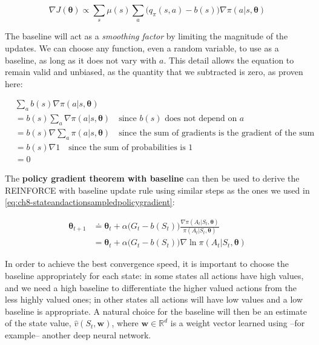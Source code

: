 \begin{equation}
    \nabla J(\boldsymbol{\theta}) \propto \sum_s \mu(s) \sum_a \big(q_\pi(s,a) - b(s) \big) \nabla\pi(a \vert s, \boldsymbol{\theta})
    \label{eq:ch8-policygradienttheoremwithbaseline}
\end{equation}

The baseline will act as a \textit{smoothing factor} by limiting the magnitude of the updates. We can choose any function, even a random variable, to use as a baseline, as long as it does not vary with $a$. This detail allows the equation to remain valid and unbiased, as the quantity that we subtracted is zero, as proven here:

\begin{equation}
    \begin{split}
        & \sum_a b(s) \nabla\pi (a \vert s,\boldsymbol{\theta}) \\
        &= b(s) \sum_a \nabla\pi (a \vert s,\boldsymbol{\theta}) \quad \text{since } b(s) \text{ does not depend on } a\\
        &= b(s) \nabla \sum_a \pi (a \vert s,\boldsymbol{\theta}) \quad \text{since the sum of gradients is the gradient of the sum}\\
        &= b(s) \nabla 1 \quad \text{since the sum of probabilities is 1} \\
        &= 0
    \end{split}
    \label{eq:ch8-policygradientwithbaselineunbiasedproof}
\end{equation}

The \textbf{policy gradient theorem with baseline} can then be used to derive the REINFORCE with baseline update rule using similar steps as the ones we used in \ref{eq:ch8-stateandactionsampledpolicygradient}:

\begin{equation}
    \begin{split}
        \boldsymbol{\theta}_{t+1} &\doteq \boldsymbol{\theta}_t + \alpha \big(G_t - b(S_t) \big) \frac{\nabla \pi (A_t \vert S_t, \boldsymbol{\theta})}{\pi (A_t \vert S_t, \boldsymbol{\theta})} \\
        &= \boldsymbol{\theta}_t + \alpha \big( G_t - b(S_t) \big) \nabla \ln{\pi (A_t \vert S_t, \boldsymbol{\theta})}
    \end{split}
    \label{eq:ch8-reinforcewithbaselineupdaterule}
\end{equation}

In order to achieve the best convergence speed, it is important to choose the baseline appropriately for each state: in some states all actions have high values, and we need a high baseline to differentiate the higher valued actions from the less highly valued ones; in other states all actions will have low values and a low baseline is appropriate. A natural choice for the baseline will then be an estimate of the state value,  $\hat{v}(S_t,\boldsymbol{w})$, where $\boldsymbol{w} \in \mathbb{R}^d$ is a weight vector learned using --for example-- another deep neural network.

